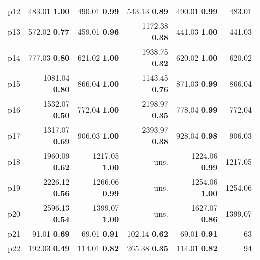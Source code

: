 \begin{tabular}{lrrrrr}
\multicolumn{1}{l|}{p12} & {\footnotesize 483.01} \textbf{1.00} & {\footnotesize 490.01} \textbf{0.99} & {\footnotesize 543.13} \textbf{0.89} & {\footnotesize 490.01} \textbf{0.99} & \multicolumn{1}{|r}{483.01}\\
\multicolumn{1}{l|}{p13} & {\footnotesize 572.02} \textbf{0.77} & {\footnotesize 459.01} \textbf{0.96} & {\footnotesize 1172.38} \textbf{0.38} & {\footnotesize 441.03} \textbf{1.00} & \multicolumn{1}{|r}{441.03}\\
\multicolumn{1}{l|}{p14} & {\footnotesize 777.03} \textbf{0.80} & {\footnotesize 621.02} \textbf{1.00} & {\footnotesize 1938.75} \textbf{0.32} & {\footnotesize 620.02} \textbf{1.00} & \multicolumn{1}{|r}{620.02}\\
\multicolumn{1}{l|}{p15} & {\footnotesize 1081.04} \textbf{0.80} & {\footnotesize 866.04} \textbf{1.00} & {\footnotesize 1143.45} \textbf{0.76} & {\footnotesize 871.03} \textbf{0.99} & \multicolumn{1}{|r}{866.04}\\
\multicolumn{1}{l|}{p16} & {\footnotesize 1532.07} \textbf{0.50} & {\footnotesize 772.04} \textbf{1.00} & {\footnotesize 2198.97} \textbf{0.35} & {\footnotesize 778.04} \textbf{0.99} & \multicolumn{1}{|r}{772.04}\\
\multicolumn{1}{l|}{p17} & {\footnotesize 1317.07} \textbf{0.69} & {\footnotesize 906.03} \textbf{1.00} & {\footnotesize 2393.97} \textbf{0.38} & {\footnotesize 928.04} \textbf{0.98} & \multicolumn{1}{|r}{906.03}\\
\multicolumn{1}{l|}{p18} & {\footnotesize 1960.09} \textbf{0.62} & {\footnotesize 1217.05} \textbf{1.00} & uns. & {\footnotesize 1224.06} \textbf{0.99} & \multicolumn{1}{|r}{1217.05}\\
\multicolumn{1}{l|}{p19} & {\footnotesize 2226.12} \textbf{0.56} & {\footnotesize 1266.06} \textbf{0.99} & uns. & {\footnotesize 1254.06} \textbf{1.00} & \multicolumn{1}{|r}{1254.06}\\
\multicolumn{1}{l|}{p20} & {\footnotesize 2596.13} \textbf{0.54} & {\footnotesize 1399.07} \textbf{1.00} & uns. & {\footnotesize 1627.07} \textbf{0.86} & \multicolumn{1}{|r}{1399.07}\\
\multicolumn{1}{l|}{p21} & {\footnotesize 91.01} \textbf{0.69} & {\footnotesize 69.01} \textbf{0.91} & {\footnotesize 102.14} \textbf{0.62} & {\footnotesize 69.01} \textbf{0.91} & \multicolumn{1}{|r}{63}\\
\multicolumn{1}{l|}{p22} & {\footnotesize 192.03} \textbf{0.49} & {\footnotesize 114.01} \textbf{0.82} & {\footnotesize 265.38} \textbf{0.35} & {\footnotesize 114.01} \textbf{0.82} & \multicolumn{1}{|r}{94}\\

\end{tabular}
